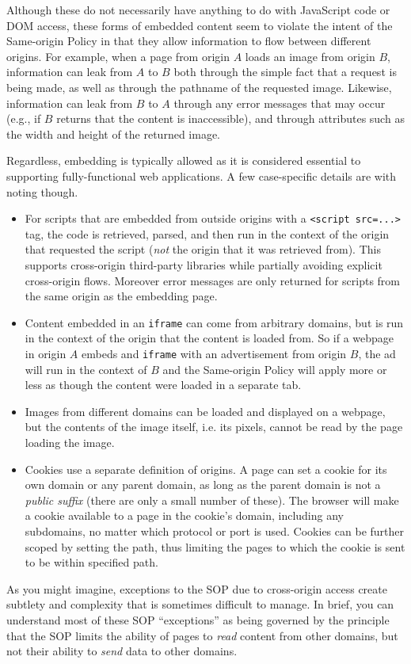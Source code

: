 \documentclass[11pt,twoside]{scrartcl}
\begin{document}
Although these do not necessarily have anything to do with JavaScript code or DOM access, these forms of embedded content seem to violate the intent of the Same-origin Policy in that they allow information to flow between different origins. For example, when a page from origin $A$ loads an image from origin $B$, information can leak from $A$ to $B$ both through the simple fact that a request is being made, as well as through the pathname of the requested image. Likewise, information can leak from $B$ to $A$ through any error messages that may occur (e.g., if $B$ returns that the content is inaccessible), and through attributes such as the width and height of the returned image.

Regardless, embedding is typically allowed as it is considered essential to supporting fully-functional web applications. A few case-specific details are with noting though.
\begin{itemize}
\item For scripts that are embedded from outside origins with a \verb'<script src=...>' tag, the code is retrieved, parsed, and then run in the context of the origin that requested the script (\emph{not} the origin that it was retrieved from). This supports cross-origin third-party libraries while partially avoiding explicit cross-origin flows. Moreover error messages are only returned for scripts from the same origin as the embedding page.
\item Content embedded in an \verb'iframe' can come from arbitrary domains, but is run in the context of the origin that the content is loaded from. So if a webpage in origin $A$ embeds and \verb'iframe' with an advertisement from origin $B$, the ad will run in the context of $B$ and the Same-origin Policy will apply more or less as though the content were loaded in a separate tab.
\item Images from different domains can be loaded and displayed on a webpage, but the contents of the image itself, i.e. its pixels, cannot be read by the page loading the image.
\item Cookies use a separate definition of origins. A page can set a cookie for its own domain or any parent domain, as long as the parent domain is not a \emph{public suffix} (there are only a small number of these). The browser will make a cookie available to a page in the cookie's domain, including any subdomains, no matter which protocol or port is used. Cookies can be further scoped by setting the path, thus limiting the pages to which the cookie is sent to be within specified path.
\end{itemize}
As you might imagine, exceptions to the SOP due to cross-origin access create subtlety and complexity that is sometimes difficult to manage. In brief, you can understand most of these SOP ``exceptions'' as being governed by the principle that the SOP limits the ability of pages to \emph{read} content from other domains, but not their ability to \emph{send} data to other domains.
\end{document}
